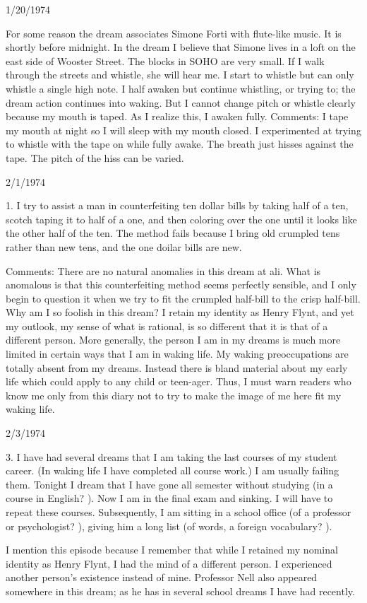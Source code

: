 \documentclass[10pt,twoside]{memoir}
\begin{document}
\begin{enumerate}
{\begin{enumerate}
\begin{sysrules}
\begin{sysrules}
\begin{sysrules}
\begin{sysrules}
{\begin{enumerate}
{{{{{{1/20/1974 

For some reason the dream associates Simone Forti with flute-like 
music. It is shortly before midnight. In the dream I believe that Simone lives 
in a loft on the east side of Wooster Street. The blocks in SOHO are very 
small. If I walk through the streets and whistle, she will hear me. I start to 
whistle but can only whistle a single high note. I half awaken but continue 
whistling, or trying to; the dream action continues into waking. But I cannot 
change pitch or whistle clearly because my mouth is taped. As I realize this, I 
awaken fully. 
Comments: I tape my mouth at night so I will sleep with my mouth closed. I 
experimented at trying to whistle with the tape on while fully awake. The 
breath just hisses against the tape. The pitch of the hiss can be varied. 


2/1/1974 

1. I try to assist a man in counterfeiting ten dollar bills by taking half 
of a ten, scotch taping it to half of a one, and then coloring over the one 
until it looks like the other half of the ten. The method fails because I bring 
old crumpled tens rather than new tens, and the one doilar bills are new. 


Comments: There are no natural anomalies in this dream at ali. What is 
anomalous is that this counterfeiting method seems perfectly sensible, and I 
only begin to question it when we try to fit the crumpled half-bill to the 
crisp half-bill. Why am I so foolish in this dream? I retain my identity as 
Henry Flynt, and yet my outlook, my sense of what is rational, is so 
different that it is that of a different person. More generally, the person I am 
in my dreams is much more limited in certain ways that I am in waking life. 
My waking preoccupations are totally absent from my dreams. Instead there 
is bland material about my early life which could apply to any child or 
teen-ager. Thus, I must warn readers who know me only from this diary not 
to try to make the image of me here fit my waking life. 


2/3/1974 

3. I have had several dreams that I am taking the last courses of my 
student career. (In waking life I have completed all course work.) I am 
usually failing them. Tonight I dream that I have gone all semester without 
studying (in a course in English? ). Now I am in the final exam and sinking. I 
will have to repeat these courses. Subsequently, I am sitting in a school 
office (of a professor or psychologist? ), giving him a long list (of words, a 
foreign vocabulary? ). {I mention this episode because I remember that while 
I retained my nominal identity as Henry Flynt, I had the mind of a different 
person. I experienced another person's existence instead of mine. Professor 
Nell also appeared somewhere in this dream; as he has in several school 
dreams I have had recently. 


}}}}}}}
\end{enumerate}}
\end{sysrules}
\end{sysrules}
\end{sysrules}
\end{sysrules}
\end{enumerate}}
\end{enumerate}
\end{document}
